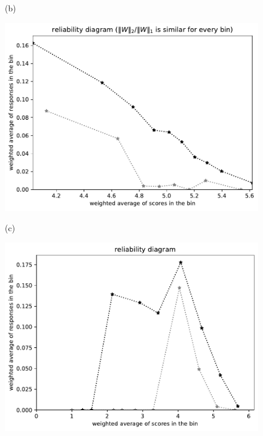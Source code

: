 \documentclass{article}
\newlength{\vertsep}
\newlength{\imsize}
\begin{document}
\begin{figure}
\begin{centering}
(b)
\parbox{\imsize}{\includegraphics[width=\imsize]
{../codes/weighted/County_of_Alameda_vs_Placer-LNGI/equierrs10.pdf}}
\quad\quad
(c)
\parbox{\imsize}{\includegraphics[width=\imsize]
{../codes/weighted/County_of_Alameda_vs_Placer-LNGI/equiscores10.pdf}}

\vspace{\vertsep}


\end{centering}
\end{figure}
\end{document}
